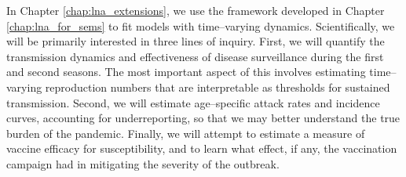 In Chapter \ref{chap:lna_extensions}, we use the framework developed in Chapter \ref{chap:lna_for_sems} to fit models with time--varying dynamics. Scientifically, we will be primarily interested in three lines of inquiry. First, we will quantify the transmission dynamics and effectiveness of disease surveillance during the first and second seasons. The most important aspect of this involves estimating time--varying reproduction numbers that are interpretable as thresholds for sustained transmission. Second, we will estimate age--specific attack rates and incidence curves, accounting for underreporting, so that we may better understand the true burden of the pandemic. Finally, we will attempt to estimate a measure of vaccine efficacy for susceptibility, and to learn what effect, if any, the vaccination campaign had in mitigating the severity of the outbreak.